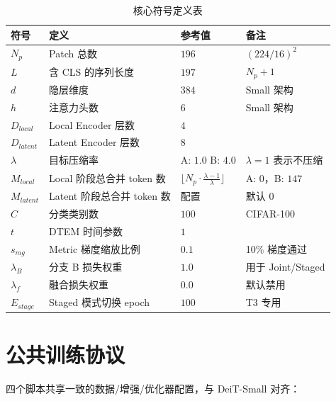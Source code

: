 \documentclass[a4paper,11pt]{article}
\begin{document}
\begin{table}[h]
\centering
\caption{核心符号定义表}
\begin{tabular}{l l l l}
\toprule
\textbf{符号} & \textbf{定义} & \textbf{参考值} & \textbf{备注} \\
\midrule
$N_p$ & Patch 总数 & $196$ & $(224/16)^2$ \\
$L$ & 含 CLS 的序列长度 & $197$ & $N_p + 1$ \\
$d$ & 隐层维度 & $384$ & Small 架构 \\
$h$ & 注意力头数 & $6$ & Small 架构 \\
$D_{local}$ & Local Encoder 层数 & $4$ & \\
$D_{latent}$ & Latent Encoder 层数 & $8$ & \\
$\lambda$ & 目标压缩率 & \makecell[l]{A: $1.0$\\ B: $4.0$} & $\lambda=1$ 表示不压缩 \\
$M_{local}$ & Local 阶段总合并 token 数 & $\lfloor N_p \cdot \frac{\lambda-1}{\lambda} \rfloor$ & A: $0$，B: $147$ \\
$M_{latent}$ & Latent 阶段总合并 token 数 & 配置 & 默认 $0$ \\
$C$ & 分类类别数 & $100$ & CIFAR-100 \\
$t$ & DTEM 时间参数 & $1$ & \\
$s_{mg}$ & Metric 梯度缩放比例 & $0.1$ & 10\% 梯度通过 \\
$\lambda_B$ & 分支 B 损失权重 & $1.0$ & 用于 Joint/Staged \\
$\lambda_f$ & 融合损失权重 & $0.0$ & 默认禁用 \\
$E_{stage}$ & Staged 模式切换 epoch & $100$ & T3 专用 \\
\bottomrule
\end{tabular}
\end{table}

\section{公共训练协议}

四个脚本共享一致的数据/增强/优化器配置，与 DeiT-Small 对齐：
\end{document}
